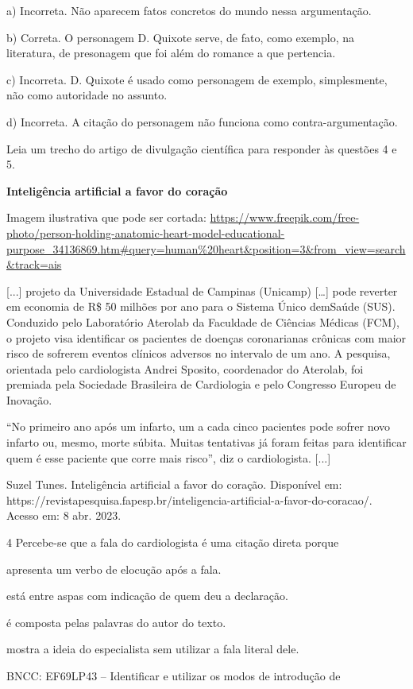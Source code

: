 a) Incorreta. Não aparecem fatos concretos do mundo nessa argumentação.

b) Correta. O personagem D. Quixote serve, de fato, como exemplo, na
literatura, de presonagem que foi além do romance a que pertencia.

c) Incorreta. D. Quixote é usado como personagem de exemplo,
simplesmente, não como autoridade no assunto.

d) Incorreta. A citação do personagem não funciona como
contra-argumentação.

Leia um trecho do artigo de divulgação científica para responder às
questões 4 e 5.

\textbf{Inteligência artificial a favor do coração}

Imagem ilustrativa que pode ser cortada:
\url{https://www.freepik.com/free-photo/person-holding-anatomic-heart-model-educational-purpose_34136869.htm\#query=human\%20heart\&position=3\&from_view=search\&track=ais}

{[}...{]} projeto da Universidade Estadual de Campinas (Unicamp)
{[}\ldots{}{]} pode reverter em economia de R\$ 50 milhões por ano para
o Sistema Único demSaúde (SUS). Conduzido pelo Laboratório Aterolab da
Faculdade de Ciências Médicas (FCM), o projeto visa identificar os
pacientes de doenças coronarianas crônicas com maior risco de sofrerem
eventos clínicos adversos no intervalo de um ano. A pesquisa, orientada
pelo cardiologista Andrei Sposito, coordenador do Aterolab, foi premiada
pela Sociedade Brasileira de Cardiologia e pelo Congresso Europeu de
Inovação.

``No primeiro ano após um infarto, um a cada cinco pacientes pode sofrer
novo infarto ou, mesmo, morte súbita. Muitas tentativas já foram feitas
para identificar quem é esse paciente que corre mais risco'', diz o
cardiologista. {[}...{]}

Suzel Tunes. Inteligência artificial a favor do coração. Disponível em:
https://revistapesquisa.fapesp.br/inteligencia-artificial-a-favor-do-coracao/.
Acesso em: 8 abr. 2023.

\num {4} Percebe-se que a fala do cardiologista é uma citação direta
porque

\begin{escolha}
\item apresenta um verbo de elocução após a fala.

\item está entre aspas com indicação de quem deu a declaração.

\item é composta pelas palavras do autor do texto.

\item mostra a ideia do especialista sem utilizar a fala literal dele.

\end{escolha}BNCC: EF69LP43 -- Identificar e utilizar os modos de introdução de

